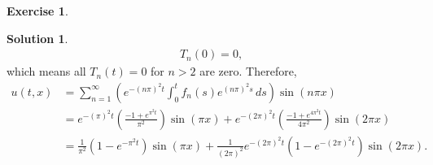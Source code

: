 \documentclass{article}
\theoremstyle{definition}
\newtheorem*{exer*}{Exercise}
\newtheorem*{sln*}{Solution}
\begin{document}
\begin{exer*}
\begin{sln*}
\begin{align*}
		T_n(0) = 0,
		\end{align*}
		which means all $T_n(t) = 0$ for $n>2$ are zero. Therefore, 
		\begin{align*}
		u(t,x) &= \sum^\infty_{n=1}\left( e^{-(n\pi)^2t}\int^t_0 f_n(s)e^{(n\pi)^2s}\,ds \right)\sin(n\pi x)\\
		&= e^{-(\pi)^2t}\left(\frac{-1 + e^{\pi^2t}}{\pi^2}\right)\sin(\pi x) + e^{-(2\pi)^2t}\left(\frac{-1 + e^{4\pi^2t}}{4\pi^2} \right)\sin(2\pi x)\\
		&= \frac{1}{\pi^2}\left(1 - e^{-\pi^2 t}\right)\sin(\pi x) + \frac{1}{(2\pi)^2}e^{-(2\pi)^2t}\left(1 - e^{-(2\pi)^2t}\right)\sin(2\pi x).
		\end{align*}
		
		
	\end{sln*}
\end{exer*}

\newpage
\end{document}
